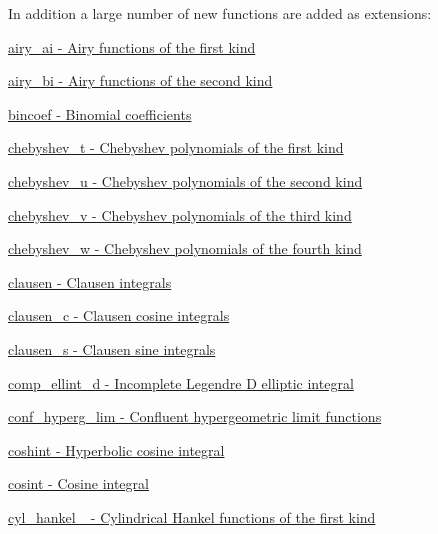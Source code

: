 In addition a large number of new functions are added as extensions\+:
\begin{DoxyItemize}
\item \hyperlink{group__gnu__math__spec__func_ga8eff81346e95e9987002ea52fe1e29a7}{airy\+\_\+ai -\/ Airy functions of the first kind}
\item \hyperlink{group__gnu__math__spec__func_ga65253611eb5aec804f9021b085be2a48}{airy\+\_\+bi -\/ Airy functions of the second kind}
\item \hyperlink{group__gnu__math__spec__func_ga57a15003ded8e0e808b21d4a17a7803e}{bincoef -\/ Binomial coefficients}
\item \hyperlink{group__gnu__math__spec__func_gad8769048d3a0eb2adcfcfeaa10af37fe}{chebyshev\+\_\+t -\/ Chebyshev polynomials of the first kind}
\item \hyperlink{group__gnu__math__spec__func_ga59e3a6dd4d614f6e158a0a56fa25a0b1}{chebyshev\+\_\+u -\/ Chebyshev polynomials of the second kind}
\item \hyperlink{group__gnu__math__spec__func_gaf5e47fa5f24acf2aac6c7a1187ee6be1}{chebyshev\+\_\+v -\/ Chebyshev polynomials of the third kind}
\item \hyperlink{group__gnu__math__spec__func_gae283d165c5a058fff7a0f83a2a66b4c2}{chebyshev\+\_\+w -\/ Chebyshev polynomials of the fourth kind}
\item \hyperlink{group__gnu__math__spec__func_ga5a7016834baf2dd1b57c9dfcfa3436f0}{clausen -\/ Clausen integrals}
\item \hyperlink{group__gnu__math__spec__func_ga2e89f9758322054738dacf686f6ce974}{clausen\+\_\+c -\/ Clausen cosine integrals}
\item \hyperlink{group__gnu__math__spec__func_ga124827c09e71d83eb11b9e3282739475}{clausen\+\_\+s -\/ Clausen sine integrals}
\item \hyperlink{group__gnu__math__spec__func_gad0fb35dfc5aef8ba2ba5fb88da1192c7}{comp\+\_\+ellint\+\_\+d -\/ Incomplete Legendre D elliptic integral}
\item \hyperlink{group__gnu__math__spec__func_gab923b5a9e67469a5145d7bfcb20b3396}{conf\+\_\+hyperg\+\_\+lim -\/ Confluent hypergeometric limit functions}
\item \hyperlink{group__gnu__math__spec__func_gaceef7e29a05055fa1e1300301f51f139}{coshint -\/ Hyperbolic cosine integral}
\item \hyperlink{group__gnu__math__spec__func_gafa310665ffc65012269f6f90cb573502}{cosint -\/ Cosine integral}
\item \hyperlink{group__gnu__math__spec__func_ga385def5d98679e243626fb78a841795b}{cyl\+\_\+hankel\+\_ -\/ Cylindrical Hankel functions of the first kind}

\end{DoxyItemize}
